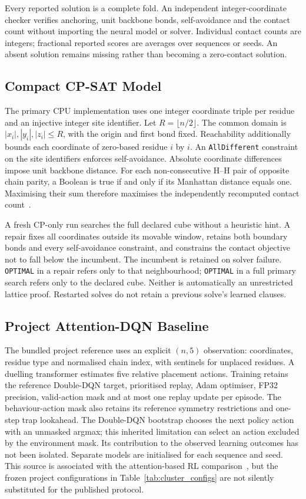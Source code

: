 \documentclass{article}
\theoremstyle{plain}
\theoremstyle{definition}
\begin{document}
Every reported solution is a complete fold. An independent integer-coordinate checker verifies anchoring, unit backbone bonds, self-avoidance and the contact count without importing the neural model or solver. Individual contact counts are integers; fractional reported scores are averages over sequences or seeds. An absent solution remains missing rather than becoming a zero-contact solution.

\subsection{Compact CP-SAT Model}\label{sec:cpsat_approach}
The primary CPU implementation uses one integer coordinate triple per residue and an injective integer site identifier. Let $R=\lfloor n/2\rfloor$. The common domain is $|x_i|,|y_i|,|z_i|\le R$, with the origin and first bond fixed. Reachability additionally bounds each coordinate of zero-based residue $i$ by $i$. An \texttt{AllDifferent} constraint on the site identifiers enforces self-avoidance. Absolute coordinate differences impose unit backbone distance. For each non-consecutive H--H pair of opposite chain parity, a Boolean is true if and only if its Manhattan distance equals one. Maximising their sum therefore maximises the independently recomputed contact count~\cite{GoogleORTools,Perron2023}.

A fresh CP-only run searches the full declared cube without a heuristic hint. A repair fixes all coordinates outside its movable window, retains both boundary bonds and every self-avoidance constraint, and constrains the contact objective not to fall below the incumbent. The incumbent is retained on solver failure. \texttt{OPTIMAL} in a repair refers only to that neighbourhood; \texttt{OPTIMAL} in a full primary search refers only to the declared cube. Neither is automatically an unrestricted lattice proof. Restarted solves do not retain a previous solve's learned clauses.

\subsection{Project Attention-DQN Baseline}\label{sec:lstma_approach}
The bundled project reference uses an explicit $(n,5)$ observation: coordinates, residue type and normalised chain index, with sentinels for unplaced residues. A duelling transformer estimates five relative placement actions. Training retains the reference Double-DQN target, prioritised replay, Adam optimiser, FP32 precision, valid-action mask and at most one replay update per episode. The behaviour-action mask also retains its reference symmetry restrictions and one-step trap lookahead. The Double-DQN bootstrap chooses the next policy action with an unmasked argmax; this inherited limitation can select an action excluded by the environment mask. Its contribution to the observed learning outcomes has not been isolated. Separate models are initialised for each sequence and seed. This source is associated with the attention-based RL comparison~\cite{AttnDRL2504}, but the frozen project configurations in Table~\ref{tab:cluster_configs} are not silently substituted for the published protocol.
\end{document}
